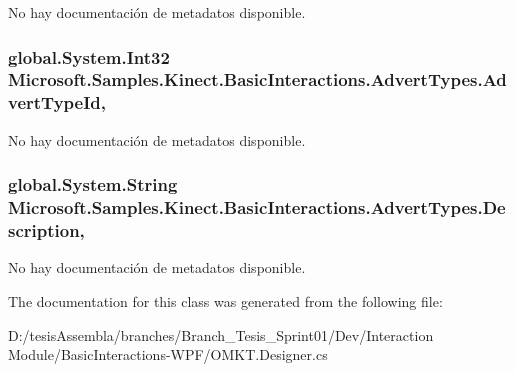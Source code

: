 No hay documentación de metadatos disponible. 

\hypertarget{class_microsoft_1_1_samples_1_1_kinect_1_1_basic_interactions_1_1_advert_types_a3ced9f92e6af22312a898c368f2a0b76}{
\subsubsection[{Advert\-Type\-Id}]{\setlength{\rightskip}{0pt plus 5cm}global.\-System.\-Int32 Microsoft.\-Samples.\-Kinect.\-Basic\-Interactions.\-Advert\-Types.\-Advert\-Type\-Id\hspace{0.3cm}{\ttfamily [get]}, {\ttfamily [set]}}}\label{class_microsoft_1_1_samples_1_1_kinect_1_1_basic_interactions_1_1_advert_types_a3ced9f92e6af22312a898c368f2a0b76}


No hay documentación de metadatos disponible. 

\hypertarget{class_microsoft_1_1_samples_1_1_kinect_1_1_basic_interactions_1_1_advert_types_a04f70c7dc1230372c7ec3ff2e1c319b4}{
\subsubsection[{Description}]{\setlength{\rightskip}{0pt plus 5cm}global.\-System.\-String Microsoft.\-Samples.\-Kinect.\-Basic\-Interactions.\-Advert\-Types.\-Description\hspace{0.3cm}{\ttfamily [get]}, {\ttfamily [set]}}}\label{class_microsoft_1_1_samples_1_1_kinect_1_1_basic_interactions_1_1_advert_types_a04f70c7dc1230372c7ec3ff2e1c319b4}


No hay documentación de metadatos disponible. 



The documentation for this class was generated from the following file\-:\begin{DoxyCompactItemize}
\item 
D\-:/tesis\-Assembla/branches/\-Branch\-\_\-\-Tesis\-\_\-\-Sprint01/\-Dev/\-Interaction Module/\-Basic\-Interactions-\/\-W\-P\-F/O\-M\-K\-T.\-Designer.\-cs\end{DoxyCompactItemize}
